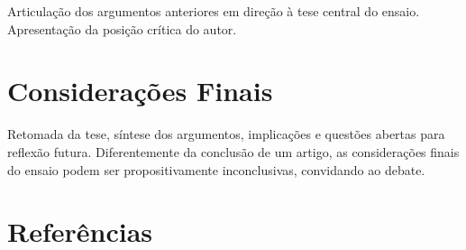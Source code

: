 \documentclass[
  12pt,
  a4paper,
  brazilian
]{article}
\begin{document}
Articulação dos argumentos anteriores em direção à tese central do ensaio.
Apresentação da posição crítica do autor.

\section{Considerações Finais}

Retomada da tese, síntese dos argumentos, implicações e questões abertas
para reflexão futura. Diferentemente da conclusão de um artigo, as
considerações finais do ensaio podem ser propositivamente inconclusivas,
convidando ao debate.

\section*{Referências}



\end{document}
